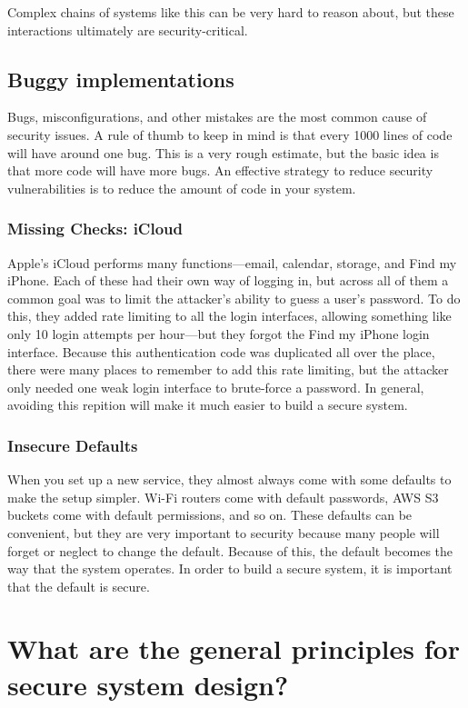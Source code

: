 Complex chains of systems like this can be very hard to reason about,
but these interactions ultimately are security-critical.

\subsection{Buggy implementations}
Bugs, misconfigurations, and other mistakes are
the most common cause of security issues. A rule
of thumb to keep in mind is that every 1000 lines
of code will have around one bug. This is a very
rough estimate, but the basic idea is that more
code will have more bugs. An effective strategy to
reduce security vulnerabilities is to reduce the
amount of code in your system.

\subsubsection{Missing Checks: iCloud}
Apple's iCloud performs many functions---email, calendar, storage, and Find my iPhone. Each of these had their own way of logging in, but across all of them a common goal was to limit the attacker's ability to guess a user's password. To do this, they added rate limiting to all the login interfaces, allowing something like only 10 login attempts per hour---but they forgot the Find my iPhone login interface.\autocite{icloud} Because this authentication code was duplicated all over the place, there were many places to remember to add this rate limiting, but the attacker only needed one weak login interface to brute-force a password. In general, avoiding this repition will make it much easier to build a secure system.

\subsubsection{Insecure Defaults}
When you set up a new service, they almost always come with some defaults to make the setup simpler. Wi-Fi routers come with default passwords, AWS S3 buckets come with default permissions, and so on. These defaults can be convenient, but they are very important to security because many people will forget or neglect to change the default. Because of this, the default becomes the way that the system operates. In order to build a secure system, it is important that the default is secure.



\section{What are the general principles for secure system design?}
